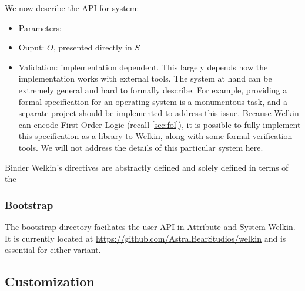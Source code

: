 \begin{itemize}
We now describe the API for system:
\begin{itemize}
  \item Parameters:
  \item Ouput: $O$, presented directly in $S$
  \item Validation: implementation dependent. This largely depends how the implementation works with external tools. The system at hand can be extremely general and hard to formally describe. For example, providing a formal specification for an operating system is a monumentous task, and a separate project should be implemented to address this issue. Because Welkin can encode First Order Logic (recall \ref{sec:fol}), it is possible to fully implement this specification as a library to Welkin, along with some formal verification tools. We will not address the details of this particular system here.
\end{itemize}



Binder Welkin's directives are abstractly defined and solely defined in terms of the

\subsubsection{Bootstrap}
\label{sec:bootstrap}
The bootstrap directory faciliates the user API in Attribute and System Welkin. It is currently located at \url{https://github.com/AstralBearStudios/welkin} and is essential for either variant.




\subsection{Customization}


\end{itemize}
